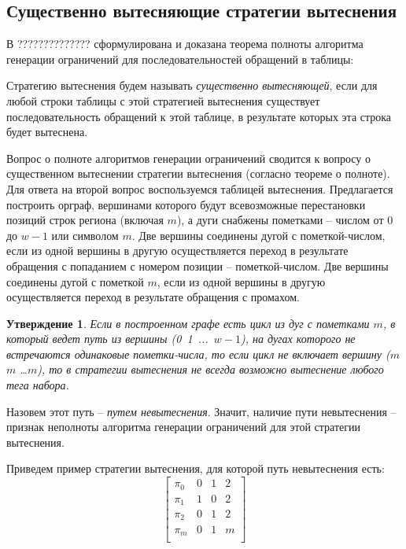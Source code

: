 \documentclass[14pt]{extreport}
\newtheorem{utv}{Утверждение}
\begin{document}
\subsection{Существенно вытесняющие стратегии
вытеснения}\label{sec:essentially_displacing}

В ?????????????? сформулирована и доказана теорема полноты алгоритма генерации
ограничений для последовательностей обращений в таблицы:
\textit{\FullnessMirror}

Стратегию вытеснения будем называть \emph{существенно вытесняющей}, если для
любой строки таблицы с этой стратегией вытеснения существует последовательность
обращений к
этой таблице, в результате которых эта строка будет вытеснена.

Вопрос о полноте алгоритмов генерации ограничений сводится к вопросу о
существенном вытеснении стратегии вытеснения (согласно теореме о полноте). Для
ответа на второй вопрос воспользуемся таблицей вытеснения. Предлагается
построить орграф, вершинами которого будут всевозможные перестановки позиций
строк региона (включая $m$), а дуги снабжены пометками -- числом от 0 до $w{-}1$
или символом
$m$. Две вершины соединены дугой с пометкой-числом, если из одной
вершины в другую осуществляется переход в результате обращения с попаданием с
номером позиции -- пометкой-числом. Две вершины соединены дугой с пометкой $m$,
если из одной вершины в другую осуществляется переход в результате обращения с
промахом.

\begin{utv}
Если в построенном графе есть цикл из дуг с пометками $m$, в который
ведет путь из вершины (0~1~...~$w{-}1$), на дугах которого не
встречаются одинаковые пометки-числа, то если цикл не включает
вершину ($m$ $m$ \dots $m$), то в стратегии вытеснения не всегда
возможно вытеснение любого тега набора.
\end{utv}

Назовем этот путь -- \emph{путем невытеснения}. Значит, наличие
пути невытеснения -- признак неполноты алгоритма генерации ограничений для этой
стратегии
вытеснения.

Приведем пример стратегии вытеснения, для которой путь невытеснения
есть:
$$\left[
  \begin{array}{c|cccc}
    \pi_0 & 0 & 1 & 2 \\
    \pi_1 & 1 & 0 & 2 \\
    \pi_2 & 0 & 1 & 2 \\
    \pi_m & 0 & 1 & m \\
  \end{array}
\right]
$$
\end{document}
